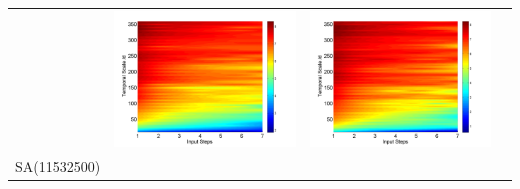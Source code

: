 \documentclass[review]{elsarticle}
\begin{document}
\begin{table}[H]
\begin{tabular}{cccc}
&\begin{minipage}{.3\textwidth}\includegraphics[width=\linewidth]{resultgraph/05585000pep_abs.png}\end{minipage}
&\begin{minipage}{.3\textwidth}\includegraphics[width=\linewidth]{resultgraph/05585000pepq_abs.png}\end{minipage}
\\
SA(11532500)

\end{tabular}
\end{table}
\end{document}
